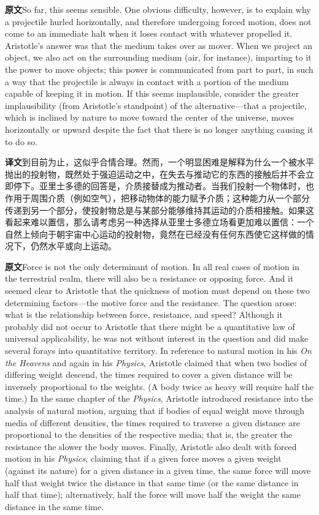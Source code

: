 \documentclass[UTF8,zihao=-4]{ctexart}
\newcommand{\BodyFont}{\fontsize{10.5pt}{15.5pt}\selectfont}
\newcommand{\origlabel}{\textbf{原文}\quad}
\newcommand{\translabel}{\textbf{译文}\quad}
\newcommand{\orig}{\par\noindent\begingroup\BodyFont\origlabel}
\newcommand{\zhline}[1]{\par\endgroup\noindent\begingroup\BodyFont\translabel #1\par\endgroup\vspace{0.35em}}
\begin{document}
\orig So far, this seems sensible. One obvious difficulty, however, is to explain why a projectile hurled horizontally, and therefore undergoing forced motion, does not come to an immediate halt when it loses contact with whatever propelled it. Aristotle's answer was that the medium takes over as mover. When we project an object, we also act on the surrounding medium (air, for instance), imparting to it the power to move objects; this power is communicated from part to part, in such a way that the projectile is always in contact with a portion of the medium capable of keeping it in motion. If this seems implausible, consider the greater implausibility (from Aristotle's standpoint) of the alternative---that a projectile, which is inclined by nature to move toward the center of the universe, moves horizontally or upward despite the fact that there is no longer anything causing it to do so.

\zhline{到目前为止，这似乎合情合理。然而，一个明显困难是解释为什么一个被水平抛出的投射物，既然处于强迫运动之中，在失去与推动它的东西的接触后并不会立即停下。亚里士多德的回答是，介质接替成为推动者。当我们投射一个物体时，也作用于周围介质（例如空气），把移动物体的能力赋予介质；这种能力从一个部分传递到另一个部分，使投射物总是与某部分能够维持其运动的介质相接触。如果这看起来难以置信，那么请考虑另一种选择从亚里士多德立场看更加难以置信：一个自然上倾向于朝宇宙中心运动的投射物，竟然在已经没有任何东西使它这样做的情况下，仍然水平或向上运动。}

\orig Force is not the only determinant of motion. In all real cases of motion in the terrestrial realm, there will also be a resistance or opposing force. And it seemed clear to Aristotle that the quickness of motion must depend on these two determining factors---the motive force and the resistance. The question arose: what is the relationship between force, resistance, and speed? Although it probably did not occur to Aristotle that there might be a quantitative law of universal applicability, he was not without interest in the question and did make several forays into quantitative territory. In reference to natural motion in his \textit{On the Heavens} and again in his \textit{Physics}, Aristotle claimed that when two bodies of differing weight descend, the times required to cover a given distance will be inversely proportional to the weights. (A body twice as heavy will require half the time.) In the same chapter of the \textit{Physics}, Aristotle introduced resistance into the analysis of natural motion, arguing that if bodies of equal weight move through media of different densities, the times required to traverse a given distance are proportional to the densities of the respective media; that is, the greater the resistance the slower the body moves. Finally, Aristotle also dealt with forced motion in his \textit{Physics}, claiming that if a given force moves a given weight (against its nature) for a given distance in a given time, the same force will move half that weight twice the distance in that same time (or the same distance in half that time); alternatively, half the force will move half the weight the same distance in the same time.
\end{document}
